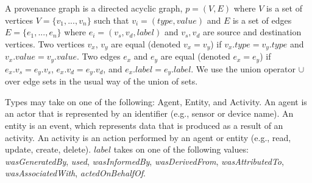 



A provenance graph is a directed acyclic graph, $p = (V,E)$ where $V$ is a set of vertices $V =\{v_1,...,v_n\}$ such that $v_i = (type, value)$ and $E$ is a set of edges $E =\{e_1,..., e_n\}$ where $e_i = (v_s, v_d, label)$ and $v_s, v_d$ are source and destination vertices. Two vertices $v_x$, $v_y$ are equal (denoted $ v_x = v_y$) if $v_x.type = v_y.type$ and $v_x.value = v_y.value$. Two edges $e_x $ and $e_y$ are equal (denoted $e_x = e_y$) if $e_x.v_s = e_y.v_s$, $e_x.v_d = e_y.v_d$, and $e_x.label = e_y.label$.  We use the union operator $\cup$ over edge sets in the usual way of the union of sets.

Types may take on one of the following: Agent, Entity, and Activity.  An agent is an actor that is represented by an identifier (e.g., sensor or device name). An entity is an event, which represents data that is produced as a result of an activity. An activity is an action performed by an agent or entity (e.g., read, update, create, delete). $label$ takes on one of the following values: \textit{wasGeneratedBy}, \textit{used}, \textit{wasInformedBy}, \textit{wasDerivedFrom}, \textit{wasAttributedTo}, \textit{wasAssociatedWith}, \textit{actedOnBehalfOf}. 




